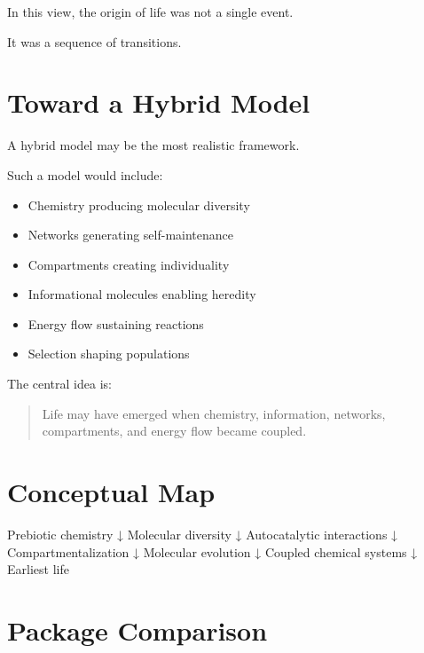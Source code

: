 \documentclass[
  oneside,
  openany]{book}
\newenvironment{Shaded}{\begin{snugshade}}{\end{snugshade}}
\newcommand{\NormalTok}[1]{#1}
\providecommand{\tightlist}{%
  \setlength{\itemsep}{0pt}\setlength{\parskip}{0pt}}
\begin{document}
In this view, the origin of life was not a single event.

It was a sequence of transitions.

\section{Toward a Hybrid Model}\label{toward-a-hybrid-model}

A hybrid model may be the most realistic framework.

Such a model would include:

\begin{itemize}
\tightlist
\item
  Chemistry producing molecular diversity
\item
  Networks generating self-maintenance
\item
  Compartments creating individuality
\item
  Informational molecules enabling heredity
\item
  Energy flow sustaining reactions
\item
  Selection shaping populations
\end{itemize}

The central idea is:

\begin{quote}
Life may have emerged when chemistry, information, networks, compartments, and energy flow became coupled.
\end{quote}

\section{Conceptual Map}\label{conceptual-map}

\begin{Shaded}
\begin{Highlighting}[]
\NormalTok{Prebiotic chemistry}
\NormalTok{        ↓}
\NormalTok{Molecular diversity}
\NormalTok{        ↓}
\NormalTok{Autocatalytic interactions}
\NormalTok{        ↓}
\NormalTok{Compartmentalization}
\NormalTok{        ↓}
\NormalTok{Molecular evolution}
\NormalTok{        ↓}
\NormalTok{Coupled chemical systems}
\NormalTok{        ↓}
\NormalTok{Earliest life}
\end{Highlighting}
\end{Shaded}

\section{Package Comparison}\label{package-comparison}
\end{document}
